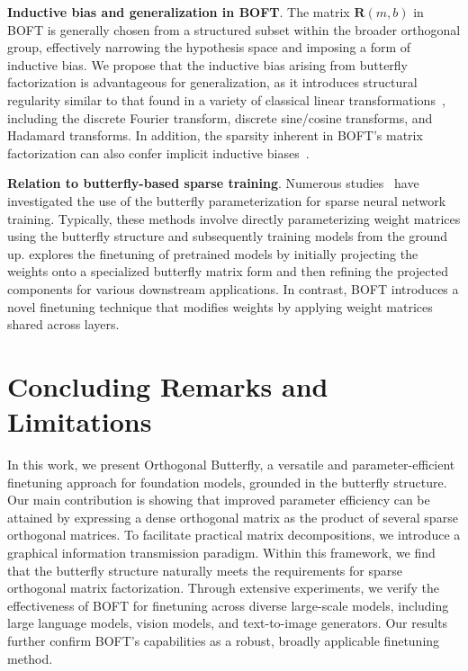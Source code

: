 \textbf{Inductive bias and generalization in BOFT}. The matrix $\bm{R}(m,b)$ in BOFT is generally chosen from a structured subset within the broader orthogonal group, effectively narrowing the hypothesis space and imposing a form of inductive bias. We propose that the inductive bias arising from butterfly factorization is advantageous for generalization, as it introduces structural regularity similar to that found in a variety of classical linear transformations~\cite{dao2019kaleidoscope}, including the discrete Fourier transform, discrete sine/cosine transforms, and Hadamard transforms. In addition, the sparsity inherent in BOFT’s matrix factorization can also confer implicit inductive biases~\cite{gunasekar2017implicit,li2018algorithmic,liu2019neural}.

\textbf{Relation to butterfly-based sparse training}. Numerous studies~\cite{dao2019learning,dao2019kaleidoscope,chen2022pixelated,dao2022monarch} have investigated the use of the butterfly parameterization for sparse neural network training. Typically, these methods involve directly parameterizing weight matrices using the butterfly structure and subsequently training models from the ground up. \cite{dao2022monarch} explores the finetuning of pretrained models by initially projecting the weights onto a specialized butterfly matrix form and then refining the projected components for various downstream applications. In contrast, BOFT introduces a novel finetuning technique that modifies weights by applying weight matrices shared across layers.



\section{Concluding Remarks and Limitations}

In this work, we present Orthogonal Butterfly, a versatile and parameter-efficient finetuning approach for foundation models, grounded in the butterfly structure. Our main contribution is showing that improved parameter efficiency can be attained by expressing a dense orthogonal matrix as the product of several sparse orthogonal matrices. To facilitate practical matrix decompositions, we introduce a graphical information transmission paradigm. Within this framework, we find that the butterfly structure naturally meets the requirements for sparse orthogonal matrix factorization. Through extensive experiments, we verify the effectiveness of BOFT for finetuning across diverse large-scale models, including large language models, vision models, and text-to-image generators. Our results further confirm BOFT's capabilities as a robust, broadly applicable finetuning method.

